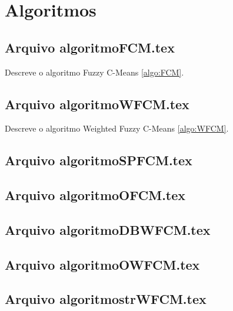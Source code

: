 \chapter{Algoritmos} \label{chAlgoritmos}

\section{Arquivo algoritmoFCM.tex}

Descreve o algoritmo Fuzzy C-Means \ref{algo:FCM}.

\section{Arquivo algoritmoWFCM.tex}

Descreve o algoritmo Weighted Fuzzy C-Means \ref{algo:WFCM}.

\section{Arquivo algoritmoSPFCM.tex}

%

\section{Arquivo algoritmoOFCM.tex}

%

\section{Arquivo algoritmoDBWFCM.tex}

%

\section{Arquivo algoritmoOWFCM.tex}

%

\section{Arquivo algoritmostrWFCM.tex}

%